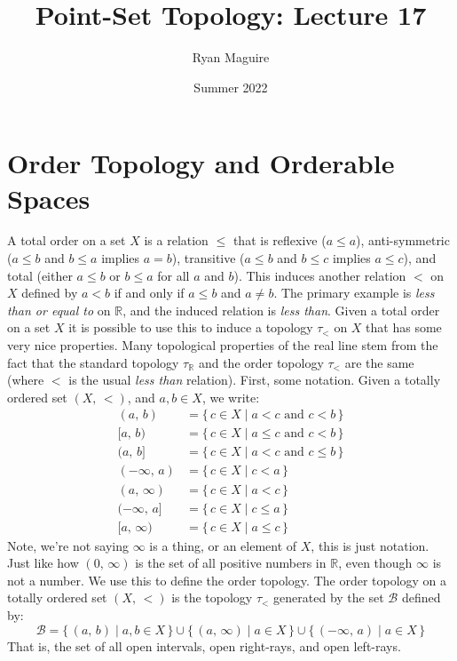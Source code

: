 \documentclass{article}
\title{Point-Set Topology: Lecture 17}
\author{Ryan Maguire}
\date{Summer 2022}
\theoremstyle{plain}
\theoremstyle{normal}
\newenvironment{definition}{%
    \pushQED{\qed}\renewcommand{\qedsymbol}{$\blacksquare$}\definitionx%
}{%
    \popQED\enddefinitionx%
}
\begin{document}
    \maketitle
    \section{Order Topology and Orderable Spaces}
        A total order on a set $X$ is a relation $\leq$ that is reflexive
        ($a\leq{a}$), anti-symmetric
        ($a\leq{b}$ and $b\leq{a}$ implies $a=b$), transitive
        ($a\leq{b}$ and $b\leq{c}$ implies $a\leq{c}$), and total
        (either $a\leq{b}$ or $b\leq{a}$ for all $a$ and $b$). This induces
        another relation $<$ on $X$ defined by $a<b$ if and only if $a\leq{b}$
        and $a\ne{b}$. The primary example is
        \textit{less than or equal to} on $\mathbb{R}$, and the induced relation
        is \textit{less than}. Given a total order on a set $X$ it is possible
        to use this to induce a topology $\tau_{<}$ on $X$ that has some very
        nice properties. Many topological properties of the real line stem from
        the fact that the standard topology $\tau_{\mathbb{R}}$ and the
        order topology $\tau_{<}$ are the same (where $<$ is the usual
        \textit{less than} relation). First, some notation. Given a totally
        ordered set $(X,\,<)$, and $a,b\in{X}$, we write:
        \begin{align}
            (a,\,b)&=\{\,c\in{X}\;|\;a<c\textrm{ and }c<b\,\}\\
            [a,\,b)&=\{\,c\in{X}\;|\;a\leq{c}\textrm{ and }c<b\,\}\\
            (a,\,b]&=\{\,c\in{X}\;|\;a<c\textrm{ and }c\leq{b}\,\}\\
            (-\infty,\,a)&=\{\,c\in{X}\;|\;c<a\,\}\\
            (a,\,\infty)&=\{\,c\in{X}\;|\;a<c\,\}\\
            (-\infty,\,a]&=\{\,c\in{X}\;|\;c\leq{a}\,\}\\
            [a,\,\infty)&=\{\,c\in{X}\;|\;a\leq{c}\,\}
        \end{align}
        Note, we're not saying $\infty$ is a thing, or an element of $X$, this
        is just notation. Just like how $(0,\,\infty)$ is the set of all
        positive numbers in $\mathbb{R}$, even though $\infty$ is not a number.
        We use this to define the order topology.
        \begin{definition}[\textbf{Order Topology}]
            The order topology on a totally ordered set $(X,\,<)$ is the
            topology $\tau_{<}$ generated by the set $\mathcal{B}$ defined by:
            \begin{equation}
                \mathcal{B}=\{\,(a,\,b)\;|\;a,b\in{X}\,\}
                    \cup\{\,(a,\,\infty)\;|\;a\in{X}\,\}
                    \cup\{\,(-\infty,\,a)\;|\;a\in{X}\,\}
            \end{equation}
            That is, the set of all open intervals, open right-rays, and
            open left-rays.
        \end{definition}
\end{document}
